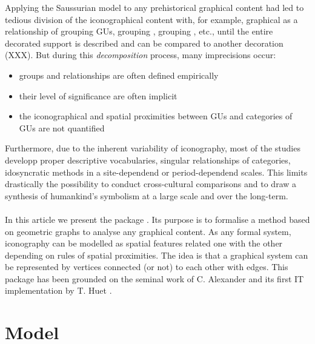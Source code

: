 \documentclass[article]{jss}\usepackage[]{graphicx}\usepackage[]{color}
\begin{document}
Applying the Saussurian model to any prehistorical graphical content had led to tedious division of the iconographical content with, for example, graphical as a relationship of  grouping GUs,  grouping ,  grouping , etc., until the entire decorated support is described and can be compared to another decoration (XXX). But during this \emph{decomposition} process, many imprecisions occur:
\begin{itemize}
  \item groups and relationships are often defined empirically
  \item their level of significance are often implicit 
  \item the iconographical and spatial proximities between GUs and categories of GUs are not quantified
\end{itemize}

Furthermore, due to the inherent variability of iconography, most of the studies developp proper descriptive vocabularies, singular relationships of categories, idosyncratic methods in a site-dependend or period-dependend scales. This limits drastically the possibility to conduct cross-cultural comparisons and to draw a synthesis of humankind's symbolism at a large scale and over the long-term. 
\\
\\
In this article we present the  package . Its purpose is to formalise a method based on geometric graphs to analyse any graphical content. As any formal system, iconography can be modelled as spatial features related one with the other depending on rules of spatial proximities. The idea is that a graphical system can be represented by vertices connected (or not) to each other with edges. This package has been grounded on the seminal work of C. Alexander \citep{Alexander08} and its first IT implementation by T. Huet \citep{Huet18a}. 

\section[Model]{Model} \label{sec:model}
\end{document}
